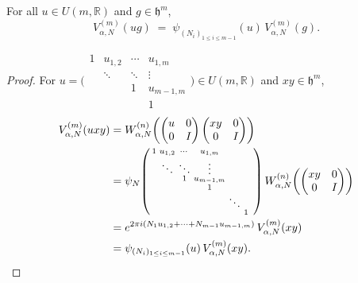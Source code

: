 \documentclass[10pt,a4paper]{amsart}
\newcommand{\R}{\mathbb{R}}
\newcommand{\hh}{\mathfrak{h}}
\begin{document}
\begin{lemma}\label{lem:equivariance}
For all $u\in U(m,\R)$ and $g\in\hh^m$,
\[
  V_{\alpha,N}^{(m)}(ug)
  \;=\;
  \psi_{(N_i)_{1\leq i\leq m-1}}(u)\,V_{\alpha,N}^{(m)}(g).
\]
\end{lemma}

\begin{proof}
For $u=\bigl(\begin{smallmatrix}1&u_{1,2}&\cdots&u_{1,m}\\&\ddots&\ddots&\vdots\\&&1&u_{m-1,m}\\&&&1\end{smallmatrix}\bigr)\in U(m,\R)$
and $xy\in\hh^m$,
\begin{align*}
  V_{\alpha,N}^{(m)}(uxy)
  &= W_{\alpha,N}^{(n)}\!\left(\begin{pmatrix}u&0\\0&I\end{pmatrix}
    \begin{pmatrix}xy&0\\0&I\end{pmatrix}\right) \\
  &= \psi_N\!\left(
    \begin{smallmatrix}
      1&u_{1,2}&\cdots&u_{1,m}&&&\\
      &\ddots&\ddots&\vdots&&\\
      &&1&u_{m-1,m}&&\\
      &&&1&&\\
      &&&&\ddots&\\
      &&&&&1
    \end{smallmatrix}
    \right)
    W_{\alpha,N}^{(n)}\!\left(\begin{pmatrix}xy&0\\0&I\end{pmatrix}\right)\\
  &= e^{2\pi i(N_1 u_{1,2}+\cdots+N_{m-1}u_{m-1,m})}\,
     V_{\alpha,N}^{(m)}(xy) \\
  &= \psi_{(N_i)_{1\leq i\leq m-1}}(u)\,V_{\alpha,N}^{(m)}(xy).\qedhere
\end{align*}
\end{proof}
\end{document}
